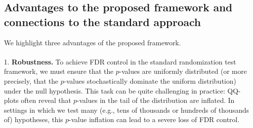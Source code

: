\documentclass[12pt]{article}
\begin{document}
\subsection*{Advantages to the proposed framework and connections to the standard approach}

We highlight three advantages of the proposed framework.
\noindent \\ \\
1. \textbf{Robustness.} To achieve FDR control in the standard randomization test framework, we must ensure that the $p$-values are uniformly distributed (or more precisely, that the $p$-values stochastically dominate the uniform distribution) under the null hypothesis. This task can be quite challenging in practice: QQ-plots often reveal that $p$-values in the tail of the distribution are inflated. In settings in which we test many (e.g., tens of thousands or hundreds of thousands of) hypotheses, this $p$-value inflation can lead to a severe loss of FDR control.
\end{document}
